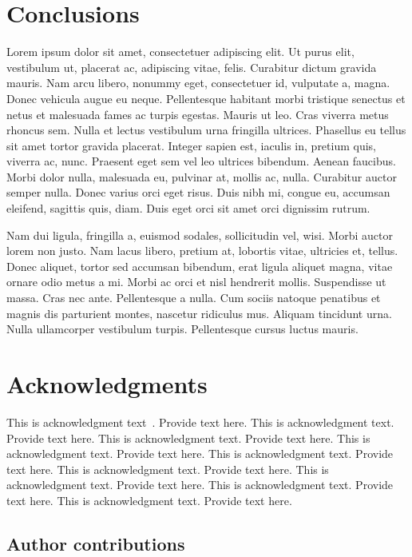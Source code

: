 \documentclass[APA,LATO1COL]{WileyNJD-v2}
\begin{document}
\section{Conclusions}\label{sec5}

Lorem ipsum dolor sit amet, consectetuer adipiscing elit. Ut purus elit, vestibulum ut, placerat ac, adipiscing vitae,
felis. Curabitur dictum gravida mauris. Nam arcu libero, nonummy eget, consectetuer id, vulputate a, magna. Donec
vehicula augue eu neque. Pellentesque habitant morbi tristique senectus et netus et malesuada fames ac turpis egestas.
Mauris ut leo. Cras viverra metus rhoncus sem. Nulla et lectus vestibulum urna fringilla ultrices. Phasellus eu tellus
sit amet tortor gravida placerat. Integer sapien est, iaculis in, pretium quis, viverra ac, nunc. Praesent eget sem vel
leo ultrices bibendum. Aenean faucibus. Morbi dolor nulla, malesuada eu, pulvinar at, mollis ac, nulla. Curabitur
auctor semper nulla. Donec varius orci eget risus. Duis nibh mi, congue eu, accumsan eleifend, sagittis quis, diam.
Duis eget orci sit amet orci dignissim rutrum.

Nam dui ligula, fringilla a, euismod sodales, sollicitudin vel, wisi. Morbi auctor lorem non justo. Nam lacus libero,
pretium at, lobortis vitae, ultricies et, tellus. Donec aliquet, tortor sed accumsan bibendum, erat ligula aliquet magna,
vitae ornare odio metus a mi. Morbi ac orci et nisl hendrerit mollis. Suspendisse ut massa. Cras nec ante. Pellentesque
a nulla. Cum sociis natoque penatibus et magnis dis parturient montes, nascetur ridiculus mus. Aliquam tincidunt
urna. Nulla ullamcorper vestibulum turpis. Pellentesque cursus luctus mauris.


\section*{Acknowledgments}
This is acknowledgment text~\cite{Elbaum2002}. Provide text here. This is acknowledgment text. Provide text here. This is acknowledgment text. Provide text here. This is acknowledgment text. Provide text here. This is acknowledgment text. Provide text here. This is acknowledgment text. Provide text here. This is acknowledgment text. Provide text here. This is acknowledgment text. Provide text here. This is acknowledgment text. Provide text here. 

\subsection*{Author contributions}
\end{document}
